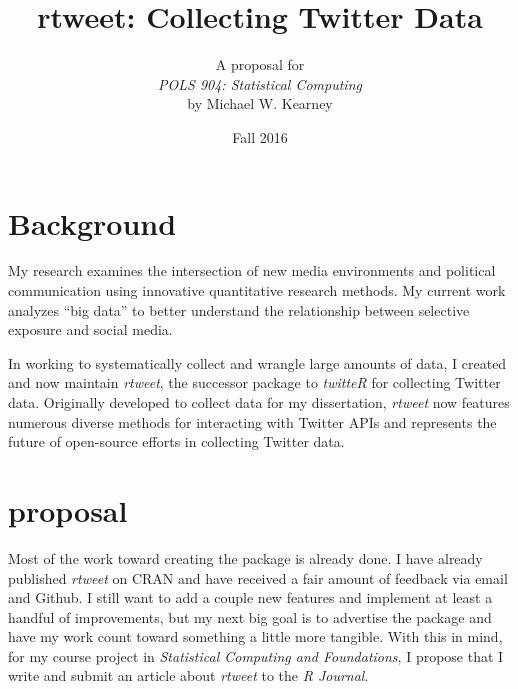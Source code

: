 \documentclass[11pt,english]{article}
\title{\textbf{rtweet: Collecting Twitter Data}}
\author{A proposal for \\\emph{POLS 904: Statistical Computing} \\ by Michael W. Kearney}
\date{Fall 2016}
\begin{document}
\maketitle

\section{Background}

My research examines the intersection of new media environments and
political communication using innovative quantitative research methods.
My current work analyzes ``big data'' to better understand the
relationship between selective exposure and social media.

In working to systematically collect and wrangle large amounts of data,
I created and now maintain \emph{rtweet}, the successor package to
\emph{twitteR} for collecting Twitter data. Originally developed to collect
data for my dissertation, \emph{rtweet} now features numerous diverse
methods for interacting with Twitter APIs and represents the future of
open-source efforts in collecting Twitter data.

\section{proposal}

Most of the work toward creating the package is already done. I have
already published \textit{rtweet} on CRAN and have received a fair amount
of feedback via email and Github. I still want to add a couple new
features and implement at least a handful of improvements, but my
next big goal is to advertise the package and have my work count toward
something a little more tangible. With this in mind, for my course project
in \textit{Statistical Computing and Foundations}, I propose that I write and
submit an article about \textit{rtweet} to the \textit{R Journal}.
\end{document}
